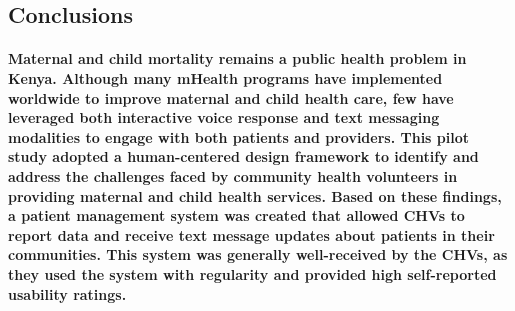 %

\subsection{Conclusions}
\paragraph{Maternal and child mortality remains a public health problem in Kenya. Although many mHealth programs have implemented worldwide to improve maternal and child health care, few have leveraged both interactive voice response and text messaging modalities to engage with both patients and providers. This pilot study adopted a human-centered design framework to identify and address the challenges faced by community health volunteers in providing maternal and child health services. Based on these findings, a patient management system was created that allowed CHVs to report data and receive text message updates about patients in their communities. This system was generally well-received by the CHVs, as they used the system with regularity and provided high self-reported usability ratings. }
